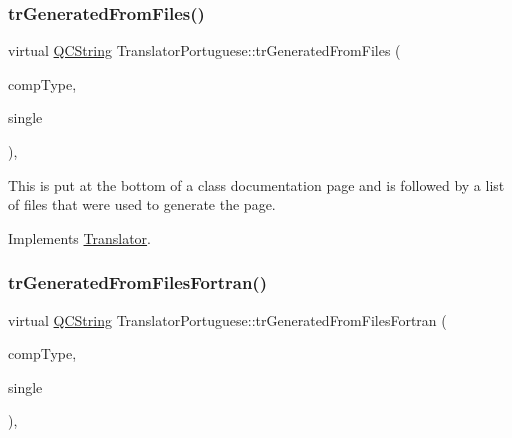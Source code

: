 \mbox{\label{class_translator_portuguese_a8bc2494fc389b136706de6fd93d8547f}} 
\subsubsection{\texorpdfstring{trGeneratedFromFiles()}{trGeneratedFromFiles()}}
{\footnotesize\ttfamily virtual \mbox{\hyperlink{class_q_c_string}{Q\+C\+String}} Translator\+Portuguese\+::tr\+Generated\+From\+Files (\begin{DoxyParamCaption}\item[{\mbox{\hyperlink{class_class_def_ae70cf86d35fe954a94c566fbcfc87939}{Class\+Def\+::\+Compound\+Type}}}]{comp\+Type,  }\item[{bool}]{single }\end{DoxyParamCaption})\hspace{0.3cm}{\ttfamily [inline]}, {\ttfamily [virtual]}}

This is put at the bottom of a class documentation page and is followed by a list of files that were used to generate the page. 

Implements \mbox{\hyperlink{class_translator}{Translator}}.

\mbox{\label{class_translator_portuguese_abcb08c99b34ea33779fd69a973cadbed}} 
\subsubsection{\texorpdfstring{trGeneratedFromFilesFortran()}{trGeneratedFromFilesFortran()}}
{\footnotesize\ttfamily virtual \mbox{\hyperlink{class_q_c_string}{Q\+C\+String}} Translator\+Portuguese\+::tr\+Generated\+From\+Files\+Fortran (\begin{DoxyParamCaption}\item[{\mbox{\hyperlink{class_class_def_ae70cf86d35fe954a94c566fbcfc87939}{Class\+Def\+::\+Compound\+Type}}}]{comp\+Type,  }\item[{bool}]{single }\end{DoxyParamCaption})\hspace{0.3cm}{\ttfamily [inline]}, {\ttfamily [virtual]}}

